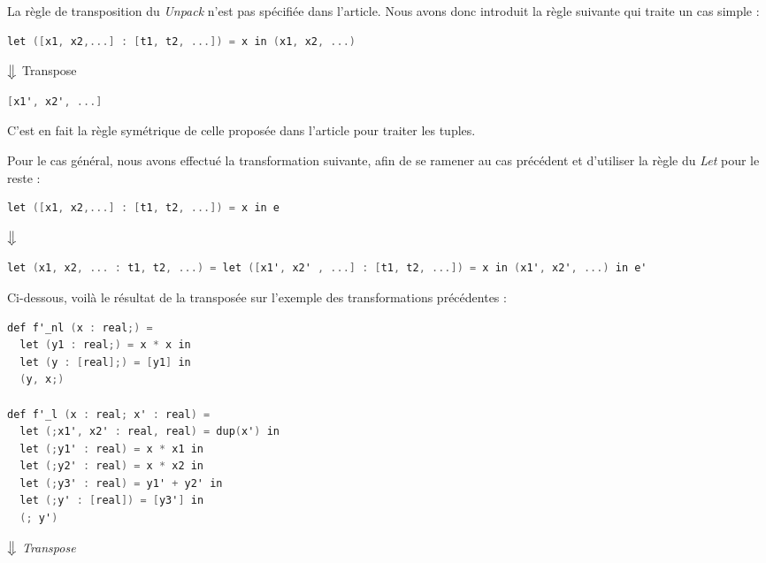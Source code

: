 \documentclass[a4paper, french, 11pt]{article}
\begin{document}
La règle de transposition du \textit{Unpack} n'est pas spécifiée dans l'article. Nous avons donc introduit la règle suivante qui traite un cas simple : 

\begin{lstlisting}[style=myStyle, language=C]
let ([x1, x2,...] : [t1, t2, ...]) = x in (x1, x2, ...)
\end{lstlisting}  
  
  \begin{center}
    $\big\Downarrow$ Transpose
  \end{center}
  
\begin{lstlisting}[style=myStyle, language=C]
[x1', x2', ...]
\end{lstlisting}

C'est en fait la règle symétrique de celle proposée dans l'article pour traiter les tuples.

Pour le cas général, nous avons effectué la transformation suivante, afin de se ramener au cas précédent et d'utiliser la règle du \textit{Let} pour le reste :

\begin{lstlisting}[style=myStyle, language=C]
let ([x1, x2,...] : [t1, t2, ...]) = x in e
\end{lstlisting}  
  
  \begin{center}
    $\big\Downarrow$
  \end{center}
  
\begin{lstlisting}[style=myStyle, language=C]
let (x1, x2, ... : t1, t2, ...) = let ([x1', x2' , ...] : [t1, t2, ...]) = x in (x1', x2', ...) in e'
\end{lstlisting}

Ci-dessous, voilà le résultat de la transposée sur l'exemple des transformations précédentes :

\begin{lstlisting}[style=myStyle, language=C]
def f'_nl (x : real;) =
  let (y1 : real;) = x * x in
  let (y : [real];) = [y1] in
  (y, x;)

def f'_l (x : real; x' : real) =
  let (;x1', x2' : real, real) = dup(x') in
  let (;y1' : real) = x * x1 in
  let (;y2' : real) = x * x2 in
  let (;y3' : real) = y1' + y2' in
  let (;y' : [real]) = [y3'] in
  (; y')
\end{lstlisting}  

\begin{center}
  $\big\Downarrow$ \textit{Transpose}
\end{center}
\end{document}
